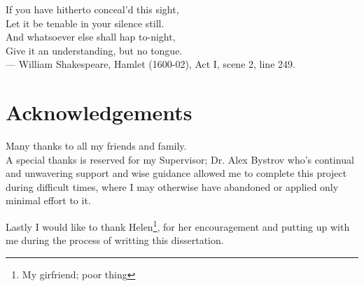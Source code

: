 

\begin{flushright}

{\slshape

If you have hitherto conceal'd this sight,\\
Let it be tenable in your silence still.\\
And whatsoever else shall hap to-night,\\
Give it an understanding, but no tongue.\\ \medskip
--- William Shakespeare, Hamlet (1600-02), Act I, scene 2, line 249.}

\end{flushright}

\bigskip


\begingroup

\let\clearpage\relax
\let\cleardoublepage\relax
\let\cleardoublepage\relax

\chapter*{Acknowledgements} %

\noindent Many thanks to all my friends and family.\\

\noindent A special thanks is reserved for my Supervisor; Dr. Alex Bystrov who's continual and unwavering support and wise guidance allowed me to complete this project during difficult times, where I may otherwise have abandoned or applied only minimal effort to it.

\bigskip

\noindent Lastly I would like to thank Helen\footnote{My girfriend; poor thing}, for her encouragement and putting up with me during the process of writting this dissertation.\\

\endgroup
